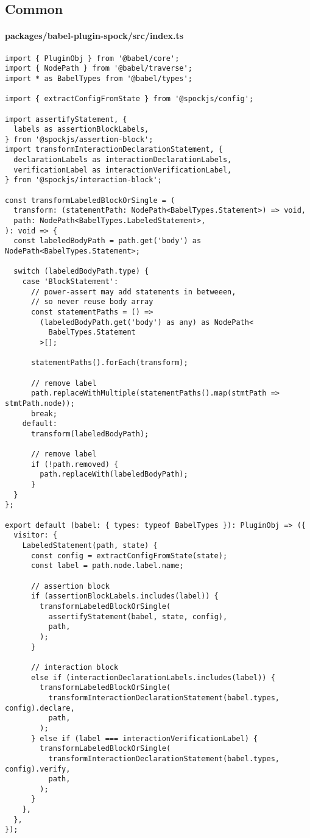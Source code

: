 \subsection*{Common}

\paragraph*{packages/babel-plugin-spock/src/index.ts}
\begin{verbatim}
import { PluginObj } from '@babel/core';
import { NodePath } from '@babel/traverse';
import * as BabelTypes from '@babel/types';

import { extractConfigFromState } from '@spockjs/config';

import assertifyStatement, {
  labels as assertionBlockLabels,
} from '@spockjs/assertion-block';
import transformInteractionDeclarationStatement, {
  declarationLabels as interactionDeclarationLabels,
  verificationLabel as interactionVerificationLabel,
} from '@spockjs/interaction-block';

const transformLabeledBlockOrSingle = (
  transform: (statementPath: NodePath<BabelTypes.Statement>) => void,
  path: NodePath<BabelTypes.LabeledStatement>,
): void => {
  const labeledBodyPath = path.get('body') as NodePath<BabelTypes.Statement>;

  switch (labeledBodyPath.type) {
    case 'BlockStatement':
      // power-assert may add statements in betweeen,
      // so never reuse body array
      const statementPaths = () =>
        (labeledBodyPath.get('body') as any) as NodePath<
          BabelTypes.Statement
        >[];

      statementPaths().forEach(transform);

      // remove label
      path.replaceWithMultiple(statementPaths().map(stmtPath => stmtPath.node));
      break;
    default:
      transform(labeledBodyPath);

      // remove label
      if (!path.removed) {
        path.replaceWith(labeledBodyPath);
      }
  }
};

export default (babel: { types: typeof BabelTypes }): PluginObj => ({
  visitor: {
    LabeledStatement(path, state) {
      const config = extractConfigFromState(state);
      const label = path.node.label.name;

      // assertion block
      if (assertionBlockLabels.includes(label)) {
        transformLabeledBlockOrSingle(
          assertifyStatement(babel, state, config),
          path,
        );
      }

      // interaction block
      else if (interactionDeclarationLabels.includes(label)) {
        transformLabeledBlockOrSingle(
          transformInteractionDeclarationStatement(babel.types, config).declare,
          path,
        );
      } else if (label === interactionVerificationLabel) {
        transformLabeledBlockOrSingle(
          transformInteractionDeclarationStatement(babel.types, config).verify,
          path,
        );
      }
    },
  },
});
\end{verbatim}

